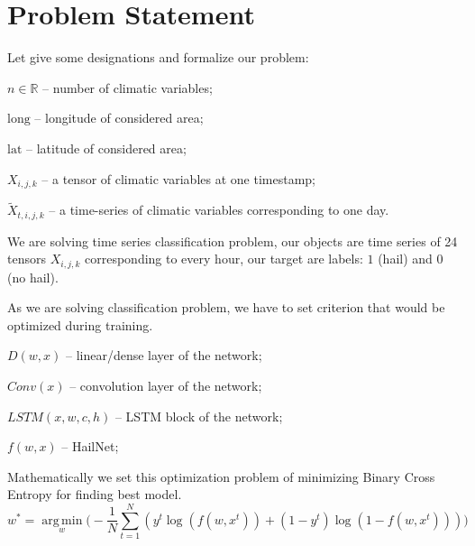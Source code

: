 \documentclass{article}
\DeclareMathOperator*{\argmin}{arg\,min}
\begin{document}
\section{Problem Statement}
Let give some designations and formalize our problem:

$n \in \mathbb{R}$ -- number of climatic variables;

$\text{long}$ -- longitude of considered area;

$\text{lat}$ -- latitude of considered area;

$X_{i,j,k}$ -- a tensor of climatic variables at one timestamp;

$\widetilde{X}_{t, i, j, k}$ -- a time-series of climatic variables corresponding to one day.

We are solving time series classification problem, our objects are time series of 24 tensors $X_{i,j,k}$ corresponding to every hour, our target are labels: $1$ (hail) and $0$ (no hail).

As we are solving classification problem, we have to set criterion that would be optimized during training.

$D(w, x)$ -- linear/dense layer of the network;

$Conv(x)$ -- convolution layer of the network;

$LSTM(x, w, c, h)$ -- LSTM block of the network;

$f(w, x)$ -- HailNet;

Mathematically we set this optimization problem of minimizing Binary Cross Entropy for finding best model.  
\begin{equation}
    w^* = \argmin\limits_w \Big ( - \frac{1}{N}\sum\limits_{t = 1 }^{N}(y ^ t \log(f(w, x^t)) + (1 - y ^ t)\log(1 - f(w, x^t)))\Big )
\end{equation}



\end{document}
